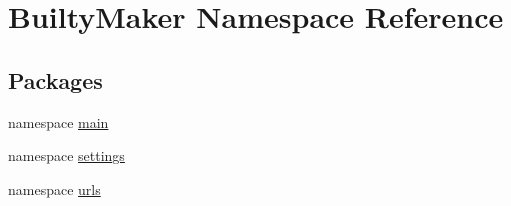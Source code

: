 \hypertarget{namespaceBuiltyMaker}{\section{\-Builty\-Maker \-Namespace \-Reference}
\label{namespaceBuiltyMaker}
}
\subsection*{\-Packages}
\begin{DoxyCompactItemize}
\item 
namespace \hyperlink{namespaceBuiltyMaker_1_1main}{main}
\item 
namespace \hyperlink{namespaceBuiltyMaker_1_1settings}{settings}
\item 
namespace \hyperlink{namespaceBuiltyMaker_1_1urls}{urls}
\end{DoxyCompactItemize}
